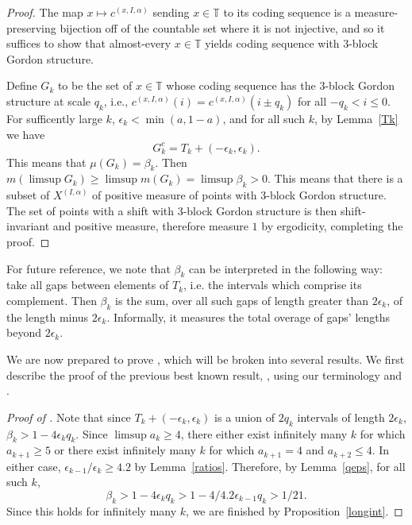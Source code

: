 \documentclass[11pt,reqno]{amsart}
\theoremstyle{definition}
\theoremstyle{plain}
\begin{document}
\begin{proof}

The map $x \mapsto c^{(x,I,\alpha)}$ sending $x \in \mathbb{T}$ to its coding sequence is a measure-preserving bijection off of the countable set where it is not injective, and so it suffices to show that almost-every $x \in \mathbb{T}$ yields coding sequence with $3$-block Gordon structure.

Define $G_k$ to be the set of $x \in \mathbb{T}$ whose coding sequence has the $3$-block Gordon structure at scale $q_k$, i.e., $c^{(x,I,\alpha)}(i) = c^{(x,I,\alpha)}(i \pm q_k)$ for all $-q_k < i \leq 0$. For sufficently large $k$, $\epsilon_k < \min(a, 1-a)$, and for all such $k$, by Lemma~\ref{Tk} we have
\[
G_k^c = T_k + (-\epsilon_k, \epsilon_k).
\]
This means that $\mu(G_k) = \beta_k$. Then $m\left(\limsup G_k\right) \geq \limsup m(G_k) = \limsup \beta_k > 0$. This means that there is a subset of $X^{(I, \alpha)}$ of positive measure of points with $3$-block Gordon structure. The set of points with a shift with $3$-block Gordon structure is then shift-invariant and positive measure, therefore measure $1$ by ergodicity, completing the proof.

\end{proof}

For future reference, we note that $\beta_k$ can be interpreted in the following way: take all gaps between elements of $T_k$, i.e. the intervals which comprise its complement. Then $\beta_k$ is the sum, over all such gaps of length greater than $2\epsilon_k$, of the length minus $2\epsilon_k$. Informally, it measures the total overage of gaps' lengths beyond $2\epsilon_k$.

We are now prepared to prove , which will be broken into several results. We first describe the proof of the previous best known result, , using our terminology and .

\begin{proof}[Proof of ]
Note that since $T_k + (-\epsilon_k, \epsilon_k)$ is a union of $2q_k$ intervals of length $2\epsilon_k$, 
$\beta_k > 1 - 4\epsilon_k q_k$. Since $\limsup a_k \geq 4$, there either exist infinitely many $k$ for which $a_{k+1} \geq 5$ or there exist infinitely many $k$ for which $a_{k+1} = 4$ and $a_{k+2} \leq 4$. In either case, $\epsilon_{k-1}/\epsilon_k \geq 4.2$ by Lemma~\ref{ratios}. Therefore, by Lemma~\ref{qeps}, for all such $k$,
\[
\beta_k > 1 - 4\epsilon_k q_k > 1 - 4/4.2 \epsilon_{k-1} q_k > 1/21.
\]
Since this holds for infinitely many $k$, we are finished by Proposition~\ref{longint}.
\end{proof}
\end{document}
